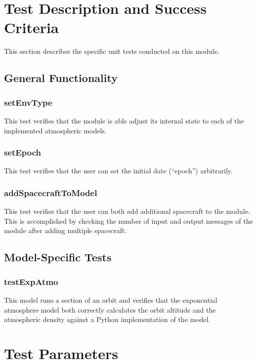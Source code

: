
\section{Test Description and Success Criteria}
This section describes the specific unit tests conducted on this module.

\subsection{General Functionality}
\subsubsection{setEnvType}

This test verifies that the module is able adjust its internal state to each of the implemented atmospheric models.

\subsubsection{setEpoch}

This test verifies that the user can set the initial date (``epoch'') arbitrarily.

\subsubsection{addSpacecraftToModel}

This test verifies that the user can both add additional spacecraft to the module. This is accomplished by checking the number of input and output messages of the module after adding multiple spacecraft.

\subsection{Model-Specific Tests}

\subsubsection{testExpAtmo}
This model runs a section of an orbit and verifies that the exponential atmosphere model both correctly calculates the orbit altitude and the atmospheric density against a Python implementation of the model. 



\section{Test Parameters}

